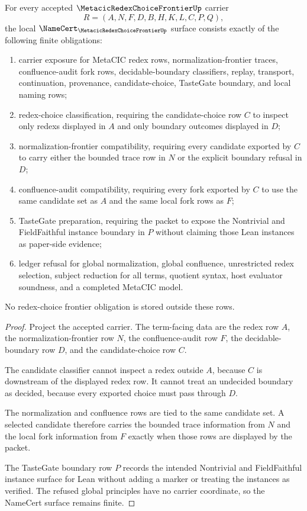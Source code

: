 \begin{theorem}
\label{thm:metacic-redex-choice-frontier-namecert-obligations}
For every accepted $\MetacicRedexChoiceFrontierUp$ carrier
$$
R=(A,N,F,D,B,H,K,L,C,P,Q),
$$
the local $\NameCert_{\MetacicRedexChoiceFrontierUp}$ surface consists exactly of the following finite obligations:
\begin{enumerate}
\item carrier exposure for MetaCIC redex rows, normalization-frontier traces, confluence-audit fork rows, decidable-boundary classifiers, replay, transport, continuation, provenance, candidate-choice, TasteGate boundary, and local naming rows;
\item redex-choice classification, requiring the candidate-choice row $C$ to inspect only redexs displayed in $A$ and only boundary outcomes displayed in $D$;
\item normalization-frontier compatibility, requiring every candidate exported by $C$ to carry either the bounded trace row in $N$ or the explicit boundary refusal in $D$;
\item confluence-audit compatibility, requiring every fork exported by $C$ to use the same candidate set as $A$ and the same local fork rows as $F$;
\item TasteGate preparation, requiring the packet to expose the Nontrivial and FieldFaithful instance boundary in $P$ without claiming those Lean instances as paper-side evidence;
\item ledger refusal for global normalization, global confluence, unrestricted redex selection, subject reduction for all terms, quotient syntax, host evaluator soundness, and a completed MetaCIC model.
\end{enumerate}
No redex-choice frontier obligation is stored outside these rows.
\end{theorem}
\begin{proof}
Project the accepted carrier. The term-facing data are the redex row $A$, the normalization-frontier row $N$, the confluence-audit row $F$, the decidable-boundary row $D$, and the candidate-choice row $C$.

The candidate classifier cannot inspect a redex outside $A$, because $C$ is downstream of the displayed redex row. It cannot treat an undecided boundary as decided, because every exported choice must pass through $D$.

The normalization and confluence rows are tied to the same candidate set. A selected candidate therefore carries the bounded trace information from $N$ and the local fork information from $F$ exactly when those rows are displayed by the packet.

The TasteGate boundary row $P$ records the intended Nontrivial and FieldFaithful instance surface for Lean without adding a marker or treating the instances as verified. The refused global principles have no carrier coordinate, so the NameCert surface remains finite.
\end{proof}

